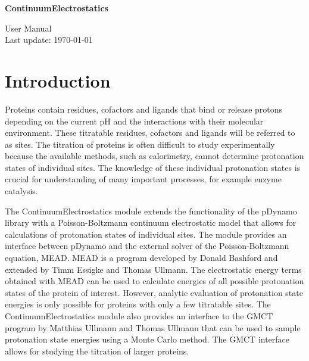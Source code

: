 \documentclass[a4paper,11pt]{article}
\newcommand{\modulename}{ContinuumElectrostatics\xspace}
\begin{document}
\begin{center}
{\LARGE \bf \modulename}

\vspace{0.5cm}
{\large User Manual\\
Last update: \today}

\end{center}

\vspace{2cm}


\section{Introduction}
Proteins contain residues, cofactors and ligands that bind or release protons 
depending on the current pH and the interactions with their molecular 
environment.
%
These titratable residues, cofactors and ligands will be referred to as sites.
%
The titration of proteins is often difficult to study experimentally because 
the available methods, such as calorimetry, cannot determine protonation states 
of individual sites.
%
The knowledge of these individual protonation states is crucial for 
understanding of many important processes, for example enzyme catalysis.


The \modulename module extends the functionality of the pDynamo 
library with a Poisson-Boltzmann continuum electrostatic model that allows for 
calculations of protonation states of individual sites.
%
The module provides an interface between pDynamo and the external solver of 
the Poisson-Boltzmann equation, MEAD.
%
MEAD is a program developed by Donald Bashford and extended by Timm Essigke
and Thomas Ullmann.
%
The electrostatic energy terms obtained with MEAD can be used to calculate 
energies of all possible protonation states of the protein of interest.
%
However, analytic evaluation of protonation state energies is only possible 
for proteins with only a few titratable sites. 
%
The \modulename module also provides an interface to the GMCT 
program by Matthias Ullmann and Thomas Ullmann that can be used to sample 
protonation state energies using a Monte Carlo method. 
%
The GMCT interface allows for studying the titration of larger proteins.


% 
% 
% 
\end{document}
